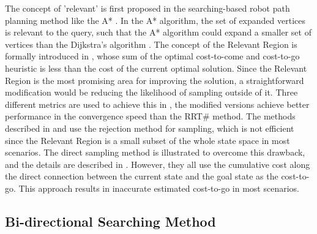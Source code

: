 The concept of 'relevant' is first proposed in the searching-based robot path planning method like the A* \cite{hart1968formal}. 
In the A* algorithm, the set of expanded vertices is relevant to the query, such that the A* algorithm could expand a smaller set of vertices than the Dijkstra's algorithm \cite{dijkstra1959note}.  
The concept of the Relevant Region is formally introduced in \cite{arslan2013use}, whose sum of the optimal cost-to-come and cost-to-go heuristic is less than the cost of the current optimal solution. 
Since the Relevant Region is the most promising area for improving the solution, a straightforward modification would be reducing the likelihood of sampling outside of it.
Three different metrics are used to achieve this in \cite{arslan2015dynamic}, the modified versions achieve better performance in the convergence speed than the RRT\# method.
The methods described in \cite{arslan2013use} and \cite{arslan2015dynamic} use the rejection method for sampling, which is not efficient since the Relevant Region is a small subset of the whole state space in most scenarios.
The direct sampling method is illustrated to overcome this drawback, and the details are described in \cite{joshi2020relevant}.
However, they all use the cumulative cost along the direct connection between the current state and the goal state as the cost-to-go. 
This approach results in inaccurate estimated cost-to-go in most scenarios.



\subsection{Bi-directional Searching Method}

